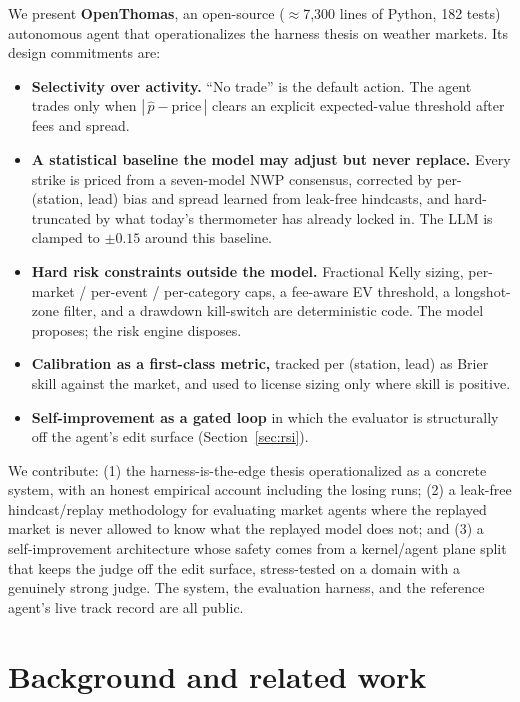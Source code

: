 \documentclass[10pt,twocolumn]{article}
\begin{document}
We present \textbf{OpenThomas}, an open-source ($\approx$7{,}300 lines of Python,
182 tests) autonomous agent that operationalizes the harness thesis on weather
markets. Its design commitments are:

\begin{itemize}
\item \textbf{Selectivity over activity.} ``No trade'' is the default action.
The agent trades only when $|\,\hat{p}-\text{price}\,|$ clears an explicit
expected-value threshold after fees and spread.
\item \textbf{A statistical baseline the model may adjust but never replace.}
Every strike is priced from a seven-model NWP consensus, corrected by
per-(station, lead) bias and spread learned from leak-free hindcasts, and hard-
truncated by what today's thermometer has already locked in. The LLM is clamped
to $\pm 0.15$ around this baseline.
\item \textbf{Hard risk constraints outside the model.} Fractional Kelly sizing,
per-market / per-event / per-category caps, a fee-aware EV threshold, a
longshot-zone filter, and a drawdown kill-switch are deterministic code. The
model proposes; the risk engine disposes.
\item \textbf{Calibration as a first-class metric,} tracked per (station, lead)
as Brier skill against the market, and used to license sizing only where skill
is positive.
\item \textbf{Self-improvement as a gated loop} in which the evaluator is
structurally off the agent's edit surface (Section~\ref{sec:rsi}).
\end{itemize}

We contribute: (1) the harness-is-the-edge thesis operationalized as a concrete
system, with an honest empirical account including the losing runs; (2) a
leak-free hindcast/replay methodology for evaluating market agents where the
replayed market is never allowed to know what the replayed model does not; and
(3) a self-improvement architecture whose safety comes from a kernel/agent plane
split that keeps the judge off the edit surface, stress-tested on a domain with a
genuinely strong judge. The system, the evaluation harness, and the reference
agent's live track record are all public.

\section{Background and related work}
\end{document}

